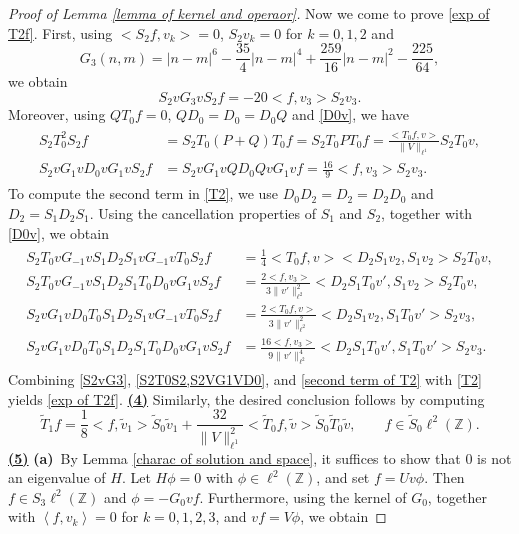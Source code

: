 \documentclass[reqno, 11pt]{amsart}
\newcommand\Z{\mathbb{Z}}
\numberwithin{equation}{section}
\begin{document}
\begin{proof}[Proof of Lemma {\ref{lemma of kernel and operaor}}]
Now we come to prove \eqref{exp of T2f}. First, using $\big<S_2f,v_k\big>=0$, $S_2v_k=0$ for $k=0,1,2$ and 
$$G_3(n,m)=|n-m|^6-\frac{35}{4}|n-m|^4+\frac{259}{16}|n-m|^2-\frac{225}{64},$$
we obtain
\begin{equation}\label{S2vG3}
S_2vG_3vS_2f=-20\big<f,v_3\big>S_2v_3.
\end{equation}
Moreover, using $QT_0f=0$, $QD_0=D_0=D_0Q$ and \eqref{D0v}, we have
\begin{align}\label{S2T0S2,S2VG1VD0}
\begin{split}
S_2{T^2_0}S_2f&=S_2T_0(P+Q)T_0f=S_2T_0PT_0f=\frac{\big<T_0f,v\big>}{\|V\|_{\ell^1}}S_2T_0v,\\
S_2vG_1vD_0vG_1vS_2f&=S_2vG_1vQD_0QvG_1vf=\frac{16}{9}\big<f,v_3\big>S_2v_3.
\end{split}
\end{align}
To compute the second term in  \eqref{T2}, we use $D_0D_2=D_2=D_2D_0$ and $D_2=S_1D_2S_1$. Using the cancellation properties of $S_1$ and $S_2$, together with \eqref{D0v}, we obtain
\begin{align}\label{second term of T2}
\begin{split}
S_2T_0vG_{-1}vS_1D_2S_1vG_{-1}vT_0S_2f&=\frac{1}{4}\big<T_0f,v\big>\big<D_2S_1v_2,S_1v_2\big>S_2T_0v,\\
S_2T_0vG_{-1}vS_1D_2S_1T_0D_0vG_1vS_2f&=\frac{2\big<f,v_3\big>}{3\|v'\|^2_{\ell^2}}\big<D_2S_1T_0v',S_1v_2\big>S_2T_0v,\\
S_2vG_1vD_0T_0S_1D_2S_1vG_{-1}vT_0S_2f&=\frac{2\big<T_0f,v\big>}{3\|v'\|^2_{\ell^2}}\big<D_2S_1v_2,S_1T_0v'\big>S_2v_3,\\
S_2vG_1vD_0T_0S_1D_2S_1T_0D_0vG_1vS_2f&=\frac{16\big<f,v_3\big>}{9\|v'\|^4_{\ell^2}}\big<D_2S_1T_0v',S_1T_0v'\big>S_2v_3.
\end{split}
\end{align}
Combining \eqref{S2vG3}, \eqref{S2T0S2,S2VG1VD0}, and \eqref{second term of T2} with \eqref{T2} yields \eqref{exp of T2f}.
\vskip0.1cm
{\bf{\underline{(4)}}} Similarly, the desired conclusion follows by computing
\begin{equation*}
\widetilde{T}_1f=\frac{1}{8}\big<f,\tilde{v}_1\big>\widetilde{S}_0\tilde{v}_1+\frac{32}{\|V\|^2_{\ell^1}}\big<\widetilde{T}_0f,\tilde{v}\big>\widetilde{S}_0\widetilde{T}_0\tilde{v},\qquad f\in \widetilde{S}_0\ell^2(\Z).
\end{equation*}
\vskip0.1cm
{\bf{\underline{(5)}}} {\bf{(a)}}~By Lemma \ref{charac of solution and space}, it suffices to show that $0$ is not an eigenvalue of $H$. Let $H\phi=0$ with $\phi\in\ell^2(\Z)$, and set $f=Uv\phi$. Then $f\in S_3\ell^2(\Z)$ and $\phi=-G_0vf$. Furthermore, using the kernel of $G_0$, together with $\left<f,v_k\right>=0$ for $k=0,1,2,3$, and $vf=V\phi$, we obtain

\end{proof}
\end{document}
